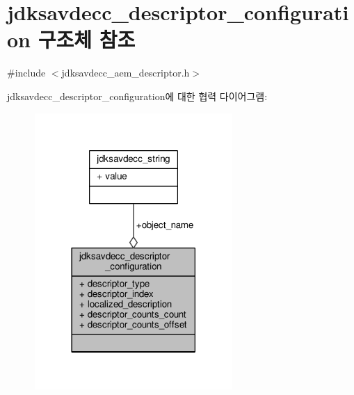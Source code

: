 \hypertarget{structjdksavdecc__descriptor__configuration}{}\section{jdksavdecc\+\_\+descriptor\+\_\+configuration 구조체 참조}
\label{structjdksavdecc__descriptor__configuration}


{\ttfamily \#include $<$jdksavdecc\+\_\+aem\+\_\+descriptor.\+h$>$}



jdksavdecc\+\_\+descriptor\+\_\+configuration에 대한 협력 다이어그램\+:
\nopagebreak
\begin{figure}[H]
\begin{center}
\leavevmode
\includegraphics[width=213pt]{structjdksavdecc__descriptor__configuration__coll__graph}
\end{center}
\end{figure}
